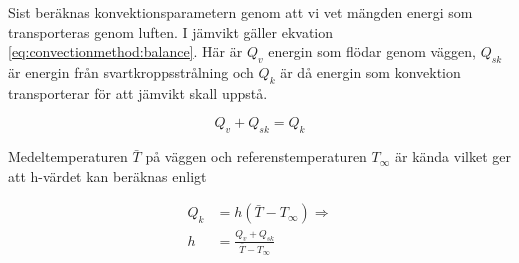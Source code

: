 Sist beräknas konvektionsparametern genom att vi vet mängden energi som transporteras
genom luften. I jämvikt gäller ekvation \eqref{eq:convectionmethod:balance}.
Här är $Q_v$ energin som flödar genom väggen, $Q_{sk}$ är energin från
svartkroppsstrålning och $Q_k$ är då energin som konvektion transporterar
för att jämvikt skall uppstå.

\begin{equation}
\label{eq:convectionmethod:balance}
Q_v + Q_{sk} = Q_k
\end{equation}

Medeltemperaturen $\bar{T}$ på väggen och referenstemperaturen $T_\infty$ är kända
vilket ger att h-värdet kan beräknas enligt

\begin{align}
Q_k &= h(\bar{T}-T_\infty) \Rightarrow \nonumber \\
h &= \frac{Q_v + Q_{sk}}{\bar{T}-T_\infty}
\end{align}
